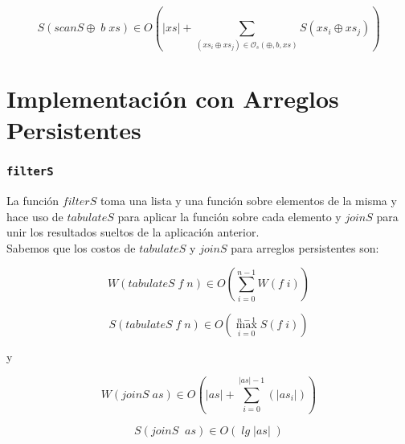 \documentclass[a4paper,10pt]{article}
\begin{document}
\begin{equation*}
    S \left( scanS \oplus \; b \; xs \right) \in
    O \left( \vert xs \vert + \sum_{(xs_i \oplus xs_j) \in \mathcal{O}_s(\oplus,b,xs)} S \left( xs_i \oplus xs_j \right) \right)
\end{equation*}





\bigskip
\newpage{}





\part*{Implementación con Arreglos Persistentes}

\section*{\texttt{filterS}}

    La función $filterS$ toma una lista y una función sobre elementos de la misma
y hace uso de $tabulateS$ para aplicar la función sobre cada elemento y $joinS$ para
unir los resultados sueltos de la aplicación anterior.\\
    Sabemos que los costos de $tabulateS$ y $joinS$ para arreglos persistentes son:

\begin{equation*}
    W \left(tabulateS \;f \;n \right) \in
    O \left( \sum_{i=0}^{n-1} W \left( f\; i \right) \right)
\end{equation*}

\bigskip

\begin{equation*}
    S \left( tabulateS \;f \;n \right) \in
    O \left( \max_{i=0}^{n-1} S \left( f\; i \right) \right)
\end{equation*}

\smallskip
\begin{center}
y
\end{center}

\begin{equation*}
    W \left(joinS \;as\right) \in
    O \left( \vert as \vert + \sum_{i=0}^{\vert as \vert -1} \left( \vert as_i \vert \right) \right)
\end{equation*}

\begin{equation*}
    S \left(joinS\; \; as \right) \in
    O \left( \;lg \; \vert as \vert \; \right)
\end{equation*}
\end{document}
